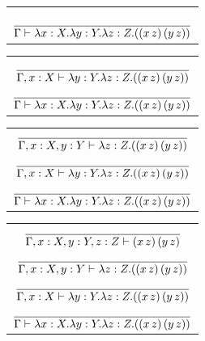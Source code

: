 \documentclass[8pt]{beamer}
\begin{document}
\begin{frame}
    \begin{example}
        \begin{overprint}
            \begin{tabular}{c}
                {}\\
                {}\\
                $\displaystyle {{}\over{\Gamma \vdash \lambda x:X. 
                \lambda y:Y.\lambda z:Z.  ((x\, z)\, (y \, z))}}$
            \end{tabular}
                \begin{tabular}{c}
                {}\\
                $\displaystyle {{{}\over{\Gamma, x:X \vdash 
                    \lambda y:Y.\lambda z:Z.  ((x\, z)\, (y \, z))}}} $\\
                $\displaystyle {{}
                    \over{\Gamma \vdash \lambda x:X. \lambda y:Y.\lambda z:Z.
                    ((x\, z)\, (y \, z))}}$
                \end{tabular}
                \begin{tabular}{c}
                $\displaystyle {{{}\over{\Gamma, x:X, y:Y \vdash 
                    \lambda z:Z.  ((x\, z)\, (y \, z))}}} $\\
                $\displaystyle {{{}\over{\Gamma, x:X \vdash 
                    \lambda y:Y.\lambda z:Z.  ((x\, z)\, (y \, z))}}} $\\
                $\displaystyle {{}
                    \over{\Gamma \vdash \lambda x:X. \lambda y:Y.\lambda z:Z.
                    ((x\, z)\, (y \, z))}}$
                \end{tabular}
                \begin{tabular}{c}
                $\displaystyle {{{}\over{\Gamma, x:X, y:Y, z:Z \vdash
                (x\, z)\, (y \, z)}}} $\\
                $\displaystyle {{{}\over{\Gamma, x:X, y:Y \vdash 
                    \lambda z:Z.  ((x\, z)\, (y \, z))}}} $\\
                $\displaystyle {{{}\over{\Gamma, x:X \vdash 
                    \lambda y:Y.\lambda z:Z.  ((x\, z)\, (y \, z))}}} $\\
                $\displaystyle {{}
                    \over{\Gamma \vdash \lambda x:X. \lambda y:Y.\lambda z:Z.
                    ((x\, z)\, (y \, z))}}$
                \end{tabular}
        \end{overprint}
    \end{example}
\end{frame}
\end{document}
